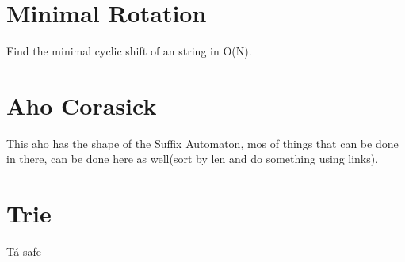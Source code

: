     \section{Minimal Rotation}
    Find the minimal cyclic shift of an string in O(N).
    
    
    \section{Aho Corasick} 
    This aho has the shape of the Suffix Automaton, mos of things that can be done in there, can be done here as well(sort by len and do something using links).

    

    \section{Trie}
    \tab Tá safe
    